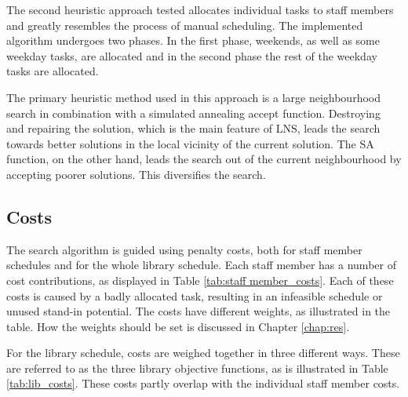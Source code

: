 The second heuristic approach tested allocates individual tasks to staff members and greatly resembles the process of manual scheduling. The implemented algorithm undergoes two phases. In the first phase, weekends, as well as some weekday tasks, are allocated and in the second phase the rest of the weekday tasks are allocated. 

The primary heuristic method used in this approach is a large neighbourhood search in combination with a simulated annealing accept function. Destroying and repairing the solution, which is the main feature of LNS, leads the search towards better solutions in the local vicinity of the current solution. The SA function, on the other hand, leads the search out of the current neighbourhood by accepting poorer solutions. This diversifies the search.

\subsection{Costs} \label{subsection:tasks_cost}
The search algorithm is guided using penalty costs, both for staff member schedules and for the whole library schedule. Each staff member has a number of cost contributions, as displayed in Table \ref{tab:staff member_costs}. Each of these costs is caused by a badly allocated task, resulting in an infeasible schedule or unused stand-in potential. The costs have different weights, as illustrated in the table. How the weights should be set is discussed in Chapter \ref{chap:res}. 

For the library schedule, costs are weighed together in three different ways. These are referred to as the three library objective functions, as is illustrated in Table \ref{tab:lib_costs}. These costs partly overlap with the individual staff member costs.

